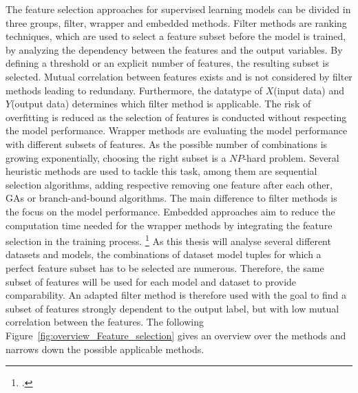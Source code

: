The feature selection approaches for supervised learning models can be divided in three groups, filter, wrapper and embedded methods.
Filter methods are ranking techniques, which are used to select a feature subset before the model is trained, by analyzing
the dependency between the features and the output variables. By defining a threshold or an explicit number of features, the
resulting subset is selected. Mutual correlation between features exists and is not considered by filter methods
leading to redundany. Furthermore, the datatype of $X$(input data) and $Y$(output data) determines which filter method is applicable. The risk
of overfitting is reduced as the selection of features is conducted without respecting the model performance.
Wrapper methods are evaluating the model performance with different subsets of features. As the possible number of combinations is growing
exponentially, choosing the right subset is a $NP$-hard problem. Several heuristic methods are used to tackle this task, among them
are sequential selection algorithms, adding respective removing one feature after each other,
\glspl{GA} or branch-and-bound algorithms. The main difference to filter methods is the focus on the model performance.
Embedded approaches aim to reduce the computation time needed for the wrapper methods by integrating the
feature selection in the training process. \footcites[cf.][pp. 17--21]{chandrashekar_survey_2014} As this thesis will analyse several
different datasets and models, the combinations of dataset model tuples for which a perfect feature subset
has to be selected are numerous. Therefore, the same subset of features will be used for each model and dataset to provide comparability.
An adapted filter method is therefore used with the goal to find a subset of features strongly dependent
to the output label, but with low mutual correlation between the features. The following Figure~\ref{fig:overview_Feature_selection}
gives an overview over the methods and narrows down the possible applicable methods.



